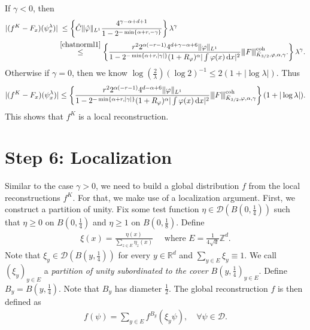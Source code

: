 If \(\gamma < 0\), then 
\begin{align}
    |(f^K - F_x)(\psi_x^\lambda)| &\;\leq \left\{  \hat C\lVert \hat \varphi \rVert_{L^1}  \frac{4^{\gamma - \alpha + d + 1}}{1 - 2^{-\min\left\{ \alpha + r, - \gamma \right\}}} \right\} \lambda^\gamma \nonumber \\
    &\overset{\eqref{chatnorml1}}{\leq} \left\{ 
        \frac{r^2 2^{\alpha(-r-1)} 4^{d+ \gamma -\alpha + 6} \lVert \varphi \rVert_{L^1}}{1-2^{- \min \left\{ \alpha + r, |\gamma| \right\}} (1+R_{\varphi})^\alpha |\int \varphi(x) \, \mathrm{d}x|^2 }
        {\left\vert\kern-0.25ex\left\vert\kern-0.25ex\left\vert F \right\vert\kern-0.25ex\right\vert\kern-0.25ex\right\vert}^{\mathrm{coh}}_{\bar K_{3/2}, \varphi, \alpha, \gamma}.
     \right\}
     \lambda^\gamma. \label{MacbookAirGammaNegative}
\end{align} 
Otherwise if \(\gamma = 0\), then we know \(\log(\frac{2}{\lambda}) (\log{2})^{-1} \leq 2(1 + |\log \lambda|)\). Thus
\begin{align*}
    |(f^K - F_x)(\psi_x^\lambda)| \leq \left\{ 
        \frac{r^2 2^{\alpha(-r-1)} 4^{d -\alpha + 6} \lVert \varphi \rVert_{L^1}}{1-2^{- \min \left\{ \alpha + r, |\gamma| \right\}} (1+R_{\varphi})^\alpha |\int \varphi(x) \, \mathrm{d}x|^2 }
        {\left\vert\kern-0.25ex\left\vert\kern-0.25ex\left\vert F \right\vert\kern-0.25ex\right\vert\kern-0.25ex\right\vert}^{\mathrm{coh}}_{\bar K_{3/2}, \varphi, \alpha, \gamma}
     \right\}
     (1 + |\log \lambda|).
\end{align*} 
This shows that \(f^K\) is a local reconstruction. 






\section{Step 6: \texorpdfstring{Localization}{Localization}}\label{chapter:step6gammaNegative}


Similar to the case \(\gamma > 0\), we need to build a global distribution \(f\) from the local reconstructions \(f^K\). For that, we make use of a localization argument. First, we construct a partition of unity. Fix some test function \(\eta \in \mathcal{D}(B(0, \frac{1}{4}))\) such that \(\eta \geq 0\) on \(B(0, \frac{1}{4})\) and \(\eta \geq 1\) on \(B(0, \frac{1}{8})\). Define 
\begin{align*}
    \xi(x) = \frac{\eta(x)}{\sum\limits_{z \in E} \eta_z(x)} \quad \text{ where } E = \frac{1}{4\sqrt{d}} \mathbb{Z}^d.
\end{align*}
Note that \(\xi_y \in \mathcal{D}(B(y, \frac{1}{4}))\) for every \(y \in \mathbb{R}^d\) and \(\sum\limits_{y \in E} \xi_y \equiv 1\). We call \((\xi_y)_{y \in E}\) a \emph{partition of unity subordinated to the cover \(B(y, \frac{1}{4})_{y \in E}\)}. Define \(B_y = B(y, \frac{1}{4})\). Note that \(B_y\) has diameter \(\frac{1}{2}\). The global reconstruction \(f\) is then defined as
\begin{align*}
    f(\psi) = \sum_{y \in E} f^{B_y}(\xi_y \psi), \quad \forall \psi \in \mathcal{D}.
\end{align*}

